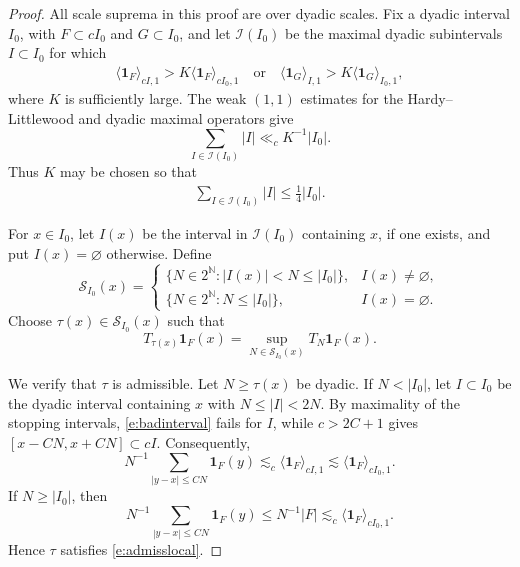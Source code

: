 \documentclass[12pt,reqno]{amsart}
\numberwithin{equation}{section}
\theoremstyle{definition}
\theoremstyle{remark}
\begin{document}
\begin{proof}
All scale suprema in this proof are over dyadic scales. Fix a dyadic interval \(I_0\), with
\(F\subset cI_0\) and \(G\subset I_0\), and let
\(\mathcal I(I_0)\) be the maximal dyadic subintervals \(I\subset I_0\)
for which
\begin{align}\label{e:badinterval}
 \langle\mathbf1_F\rangle_{cI,1}
 >K\langle\mathbf1_F\rangle_{cI_0,1}
 \quad\text{or}\quad
 \langle\mathbf1_G\rangle_{I,1}
 >K\langle\mathbf1_G\rangle_{I_0,1},
\end{align}
where \(K\) is sufficiently large.  The weak \((1,1)\) estimates for
the Hardy--Littlewood and dyadic maximal operators give
\[
 \sum_{I\in\mathcal I(I_0)}|I|
 \ll_c K^{-1}|I_0|.
\]
Thus \(K\) may be chosen so that
\begin{align}\label{e:packing}
 \sum_{I\in\mathcal I(I_0)}|I|\leq\tfrac14|I_0|.
\end{align}

For \(x\in I_0\), let \(I(x)\) be the interval in
\(\mathcal I(I_0)\) containing \(x\), if one exists, and put
\(I(x)=\varnothing\) otherwise.  Define
\[
 \mathcal S_{I_0}(x)=
 \begin{cases}
 \{N\in2^{\mathbb N}:|I(x)|<N\leq|I_0|\},
 &I(x)\neq\varnothing,\\
 \{N\in2^{\mathbb N}:N\leq|I_0|\},
 &I(x)=\varnothing.
 \end{cases}
\]
Choose \(\tau(x)\in\mathcal S_{I_0}(x)\) such that
\[
 T_{\tau(x)}\mathbf1_F(x)
 =
 \sup_{N\in\mathcal S_{I_0}(x)}T_N\mathbf1_F(x).
\]

We verify that \(\tau\) is admissible.  Let \(N\geq\tau(x)\) be
dyadic.  If \(N<|I_0|\), let \(I\subset I_0\) be the dyadic interval
containing \(x\) with \(N\leq|I|<2N\).  By maximality of the stopping
intervals, \eqref{e:badinterval} fails for \(I\), while
\(c>2C+1\) gives $[x-CN,x+CN]\subset cI.$
Consequently,
\[
 N^{-1}\sum_{|y-x|\leq CN}\mathbf1_F(y)
 \lesssim_c
 \langle\mathbf1_F\rangle_{cI,1}
 \lesssim
 \langle\mathbf1_F\rangle_{cI_0,1}.
\]
If \(N\geq|I_0|\), then
\[
 N^{-1}\sum_{|y-x|\leq CN}\mathbf1_F(y)
 \leq N^{-1}|F|
 \lesssim_c\langle\mathbf1_F\rangle_{cI_0,1}.
\]
Hence \(\tau\) satisfies \eqref{e:admisslocal}.




\end{proof}
\end{document}
